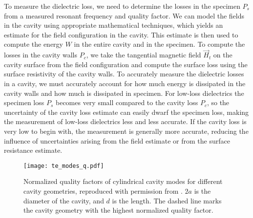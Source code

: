 To measure the dielectric loss, we need to determine the losses in the specimen $P_s$ from a measured resonant frequency and quality factor. We can model the fields in the cavity using appropriate mathematical techniques, which yields an estimate for the field configuration in the cavity. This estimate is then used to compute the energy $W$ in the entire cavity and in the specimen. To compute the losses in the cavity walls $P_c$, we take the  tangential magnetic field $\vec{H}_t$ on the cavity surface from the field configuration and compute the surface loss using the surface resistivity of the cavity walls. To accurately measure the dielectric losses in a cavity, we must accurately account for how much energy is dissipated in the cavity walls and how much is dissipated in specimen. For low-loss dielectrics the specimen loss $P_s$ becomes very small compared to the cavity loss $P_c$, so the uncertainty of the cavity loss estimate can easily dwarf the specimen loss, making the measurement of low-loss dielectrics less and less accurate. If the cavity loss is very low to begin with, the measurement is generally more accurate, reducing the influence of uncertainties arising from the field estimate or from the surface resistance estimate.

\begin{figure}
\centering
\texttt{[image: te\_modes\_q.pdf]}
\caption{Normalized quality factors of cylindrical cavity modes for different cavity geometries, reproduced with permission from \cite{pozar}. $2a$ is the diameter of the cavity, and $d$ is the length. The dashed line marks the cavity geometry with the highest normalized quality factor.}\label{fig:q_cc}
\end{figure}

